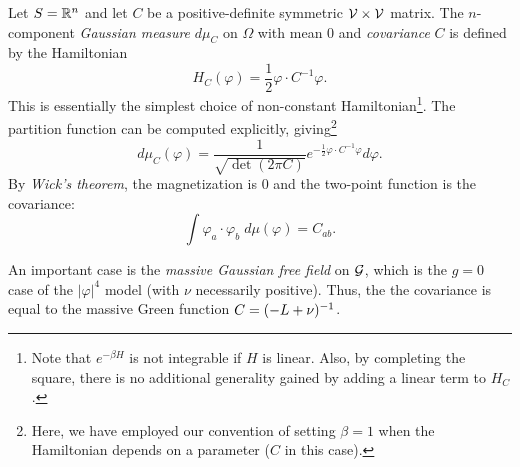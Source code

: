 

\begin{example}
Let $S = {\mathbb R}^n$ and let $C$ be a positive-definite symmetric $\mathcal{V}\times\mathcal{V}$ matrix. The $n$-component \emph{Gaussian measure} $d\mu_C$ on
$\Omega$ with mean $0$ and \emph{covariance} $C$ is defined by the Hamiltonian
\begin{equation}
H_C(\varphi) = \frac{1}{2} \varphi \cdot C^{-1} \varphi.
\end{equation}
This is essentially the simplest choice of non-constant
Hamiltonian\footnote{Note that $e^{-\beta H}$ is not integrable if $H$ is linear. Also, by completing the square, there is no additional generality gained by adding a linear term to $H_C$.}.
The partition function can be computed explicitly, giving\footnote{Here, we have employed our convention of setting $\beta = 1$ when the Hamiltonian depends on a parameter ($C$ in this case).}
\begin{equation}
d\mu_C(\varphi)
  =
\frac{1}{\sqrt{\det(2\pi C)}} e^{-\frac{1}{2} \varphi\cdot C^{-1}\varphi} d\varphi.
\end{equation}
By \emph{Wick's theorem}, the magnetization is $0$ and the two-point function is the covariance:
\begin{equation}
\int \varphi_a \cdot \varphi_b \; d\mu(\varphi) = C_{ab}.
\end{equation}

An important case is the \emph{massive Gaussian free field} on $\mathcal{G}$,
which is the $g = 0$ case of the $|\varphi|^4$ model (with $\nu$ necessarily positive).
Thus, the the covariance is equal to the massive Green function $C = (-L + \nu)^{-1}$.
\end{example}

